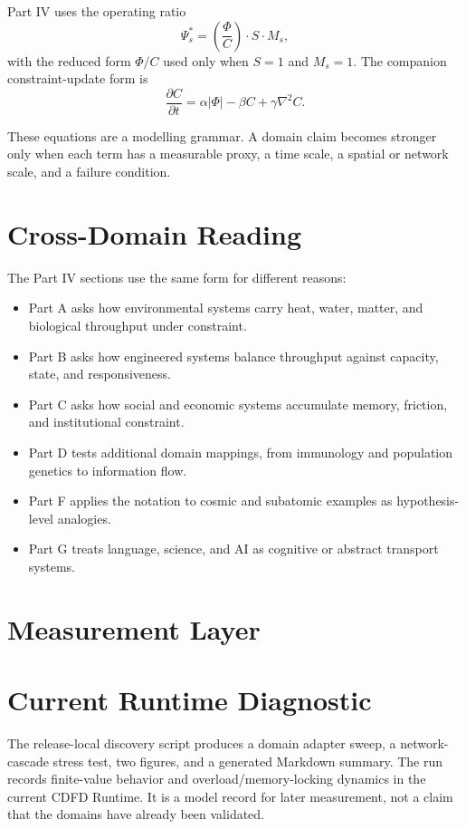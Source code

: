 \documentclass[12pt,a4paper]{article}
\begin{document}
Part IV uses the operating ratio
\begin{equation}
    \Psi_s^* = \left(\frac{\Phi}{C}\right) \cdot S \cdot M_s,
\end{equation}
with the reduced form $\Phi/C$ used only when $S=1$ and $M_s=1$. The companion
constraint-update form is
\begin{equation}
    \frac{\partial C}{\partial t} = \alpha |\Phi| - \beta C + \gamma \nabla^2 C.
\end{equation}

These equations are a modelling grammar. A domain claim becomes stronger only
when each term has a measurable proxy, a time scale, a spatial or network
scale, and a failure condition.

\section{Cross-Domain Reading}

The Part IV sections use the same form for different reasons:
\begin{itemize}
    \item Part A asks how environmental systems carry heat, water, matter, and
    biological throughput under constraint.
    \item Part B asks how engineered systems balance throughput against
    capacity, state, and responsiveness.
    \item Part C asks how social and economic systems accumulate memory,
    friction, and institutional constraint.
    \item Part D tests additional domain mappings, from immunology and
    population genetics to information flow.
    \item Part F applies the notation to cosmic and subatomic examples as
    hypothesis-level analogies.
    \item Part G treats language, science, and AI as cognitive or abstract
    transport systems.
\end{itemize}

\section{Measurement Layer}

\section{Current Runtime Diagnostic}

The release-local discovery script
produces a domain adapter sweep, a network-cascade stress test, two figures,
and a generated Markdown summary. The run records finite-value behavior and
overload/memory-locking dynamics in the current CDFD Runtime. It is a model
record for later measurement, not a claim that the domains have already been
validated.
\end{document}
